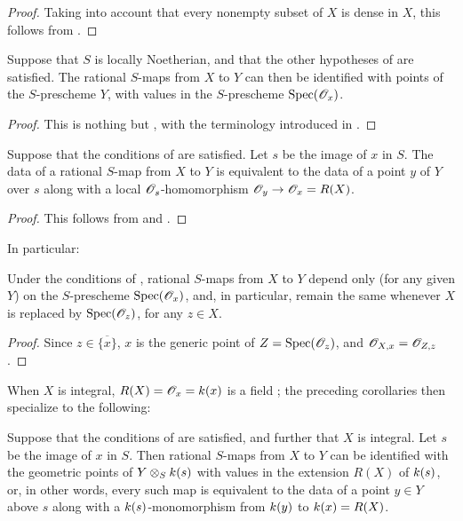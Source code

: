 \begin{proof}
Taking into account that every nonempty subset of $X$ is dense in $X$, this follows from .
\end{proof}

\begin{corollary}[7.1.12]
\label{I.7.1.12}
Suppose that $S$ is locally Noetherian, and that the other hypotheses of  are satisfied.
The rational $S$-maps from $X$ to $Y$ can then be identified with points of the $S$-prescheme $Y$, with values in the $S$-prescheme $\operatorname{Spec}(\mathscr{O}_x)$.
\end{corollary}

\begin{proof}
This is nothing but , with the terminology introduced in .
\end{proof}

\begin{corollary}[7.1.13]
\label{I.7.1.13}
Suppose that the conditions of  are satisfied.
Let $s$ be the image of $x$ in $S$.
The data of a rational $S$-map from $X$ to $Y$ is equivalent to the data of a point $y$ of $Y$ over $s$ along with a local $\mathscr{O}_s$-homomorphism $\sh{O}_y\to\sh{O}_x=R(X)$.
\end{corollary}

\begin{proof}
This follows from  and .
\end{proof}

In particular:
\begin{corollary}[7.1.14]
\label{I.7.1.14}
Under the conditions of , rational $S$-maps from $X$ to $Y$ depend only (for any given $Y$) on the $S$-prescheme $\operatorname{Spec}(\mathscr{O}_x)$, and, in particular, remain the same whenever $X$ is replaced by $\operatorname{Spec}(\mathscr{O}_z)$, for any $z\in X$.
\end{corollary}

\begin{proof}
Since $z\in\overline{\{x\}}$, $x$ is the generic point of $Z=\operatorname{Spec}(\mathscr{O}_z)$, and $\mathscr{O}_{X,x}=\mathscr{O}_{Z,z}$.
\end{proof}

When $X$ is integral, $R(X)=\mathscr{O}_x=k(x)$ is a field ; the preceding corollaries then specialize to the following:
\begin{corollary}[7.1.15]
\label{I.7.1.15}
Suppose that the conditions of  are satisfied, and further that $X$ is integral.
Let $s$ be the image of $x$ in $S$.
Then rational $S$-maps from $X$ to $Y$ can be identified with the geometric points of $Y\otimes_Sk(s)$ with values in the extension $R(X)$ of $k(s)$, or, in other words, every such map is equivalent to the data of a point $y\in Y$ above $s$ along with a $k(s)$-monomorphism from $k(y)$ to $k(x)=R(X)$.
\end{corollary}

